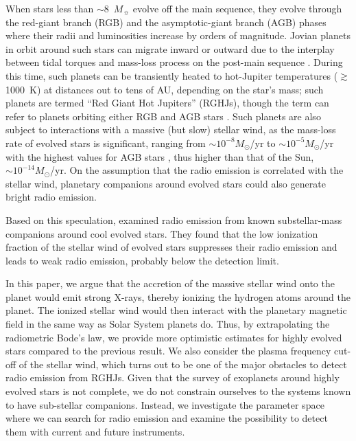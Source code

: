 \documentclass[iop,numberedappendix,apj]{emulateapj}
\begin{document}
When stars less than $\sim$8~$M_\sun$ evolve off the main sequence, they evolve through the red-giant branch (RGB) and the asymptotic-giant branch (AGB) phases where their radii and luminosities increase by orders of magnitude.
Jovian planets in orbit around such stars can migrate inward or outward due to the interplay between tidal torques and mass-loss process on the post-main sequence \citep{nordhaus_et_al2010,nordhaus+spiegel2013}.  During this time, such planets can be transiently heated to hot-Jupiter temperatures ($\gtrsim$1000~K) at distances out to tens of AU, depending on the star's mass; such planets are termed ``Red Giant Hot Jupiters'' (RGHJs), though the term can refer to planets orbiting either RGB and AGB stars \citep{spiegel+madhusudhan2012}.
Such planets are also subject to interactions with a massive (but slow) stellar wind, as the mass-loss rate of evolved stars is significant, ranging from $\sim 10^{-8} M_\odot$/yr to $\sim  10^{-5} M_\odot$/yr with the highest values for AGB stars \citep[e.g.,][]{reimers1975, schild1989, vassiliadis1993, schoier2001, vanloon2005}, thus higher than that of the Sun, $\sim 10^{-14}M_\odot$/yr. 
On the assumption that the radio emission is correlated with the stellar wind, planetary companions around evolved stars could also generate bright radio emission. 

Based on this speculation, \citet{ignace2010} examined radio emission from known substellar-mass companions around cool evolved stars.
They found that the low ionization fraction of the stellar wind of evolved stars suppresses their radio emission and leads to weak radio emission, probably below the detection limit. 

In this paper, we argue that the accretion of the massive stellar wind onto the planet would emit strong X-rays, thereby ionizing the hydrogen atoms around the planet.
The ionized stellar wind would then interact with the planetary magnetic field in the same way as Solar System planets do.
Thus, by extrapolating the radiometric Bode's law, we provide more optimistic estimates for highly evolved stars compared to the previous result.
We also consider the plasma frequency cut-off of the stellar wind, which turns out to be one of the major obstacles to detect radio emission from RGHJs. 
Given that the survey of exoplanets around highly evolved stars is not complete, we do not constrain ourselves to the systems known to have sub-stellar companions.
Instead, we investigate the parameter space where we can search for radio emission and examine the possibility to detect them with current and future instruments. 
\end{document}

